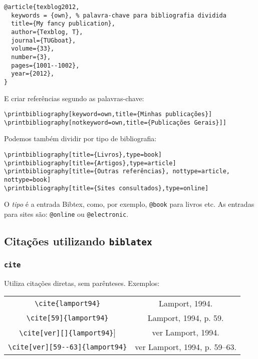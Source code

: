 \begin{verbatim}
@article{texblog2012,
  keywords = {own}, % palavra-chave para bibliografia dividida
  title={My fancy publication},
  author={Texblog, T},
  journal={TUGboat},
  volume={33},
  number={3},
  pages={1001--1002},
  year={2012},
}

\end{verbatim}
E criar  referências segundo as palavras-chave:

\begin{verbatim}
\printbibliography[keyword=own,title={Minhas publicações}]
\printbibliography[notkeyword=own,title={Publicações Gerais}]]
\end{verbatim}

Podemos também dividir por tipo de bibliografia:

\begin{verbatim}
\printbibliography[title={Livros},type=book]
\printbibliography[title={Artigos},type=article]
\printbibliography[title={Outras referências}, nottype=article, nottype=book]
\printbibliography[title={Sites consultados},type=online]
\end{verbatim}

O \textit{tipo} é a entrada Bibtex, como, por exemplo, \verb+@book+ para livros etc. As entradas para sites são: \verb+@online+ ou \verb+@electronic+.

\subsection{Citações utilizando \texttt{biblatex}}

\subsubsection*{\texttt{cite}}
Utiliza citações diretas, sem parênteses. Exemplos:


\begin{tabular}{cc}
\centering
\verb+\cite{lamport94}+ &  Lamport, 1994.\\

\verb+\cite[59]{lamport94}+ & Lamport, 1994, p. 59.\\

\verb+\cite[ver][]{lamport94}+] & ver Lamport, 1994.\\

\verb+\cite[ver][59--63]{lamport94}+ & ver Lamport, 1994, p. 59--63.\\
\end{tabular}

